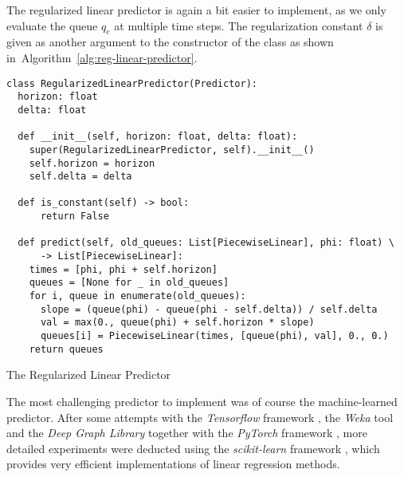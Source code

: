 The regularized linear predictor is again a bit easier to implement, as we only evaluate the queue $q_e$ at multiple time steps.
The regularization constant $\delta$ is given as another argument to the constructor of the class as shown in~Algorithm~\ref{alg:reg-linear-predictor}.

\begin{algorithm}[H]
  \begin{verbatim}
class RegularizedLinearPredictor(Predictor):
  horizon: float
  delta: float

  def __init__(self, horizon: float, delta: float):
    super(RegularizedLinearPredictor, self).__init__()
    self.horizon = horizon
    self.delta = delta

  def is_constant(self) -> bool:
      return False

  def predict(self, old_queues: List[PiecewiseLinear], phi: float) \
      -> List[PiecewiseLinear]:
    times = [phi, phi + self.horizon]
    queues = [None for _ in old_queues]
    for i, queue in enumerate(old_queues):
      slope = (queue(phi) - queue(phi - self.delta)) / self.delta
      val = max(0., queue(phi) + self.horizon * slope)
      queues[i] = PiecewiseLinear(times, [queue(phi), val], 0., 0.)
    return queues
  \end{verbatim}
  \caption{The Regularized Linear Predictor}
  \label{alg:reg-linear-predictor}
\end{algorithm}

The most challenging predictor to implement was of course the machine-learned predictor.
After some attempts with the \emph{Tensorflow} framework \cite{tensorflow}, the \emph{Weka} tool \cite{frank2005weka} and the \emph{Deep Graph Library} \cite{dgl} together with the \emph{PyTorch} framework \cite{pytorch}, more detailed experiments were deducted using the \emph{scikit-learn} framework \cite{scikit-learn}, which provides very efficient implementations of linear regression methods.

